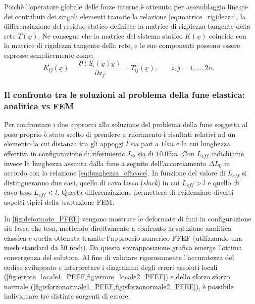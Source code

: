 Poichè l'operatore globale delle forze interne è ottenuto per assemblaggio lineare dei contributi dei singoli elementi tramite la relazione \eqref{eq:matrice_rigidezza}, la differenziazione del residuo statico definisce la matrice di rigidezza tangente della rete $T(\underline{x})$. Ne consegue che la matrice del sistema statico $K(\underline{x})$ coincide con la matrice di rigidezza tangente della rete, e le sue componenti possono essere espresse semplicemente come:
\begin{equation}
   K_{ij}(\underline{x}) = \frac{\partial (S_i(\underline{x})\underline{x})}{\partial x_j} = T_{ij}(\underline{x}),
   \qquad i,j = 1,\dots,2n.
   \label{eq:jacobiana_componenti2}
\end{equation}

\subsubsection{Il confronto tra le soluzioni al problema della fune elastica: analitica vs FEM }
Per confrontare i due approcci alla soluzione del problema della fune soggetta al peso proprio è stato scelto di prendere a riferimento i risultati relativi ad un elemento la cui distanza tra gli appoggi $l$ sia pari a $10m$ e la cui lunghezza effettiva in configurazione di riferimento $L_0$ sia di $10.05m$. Con $L_{eff}$ indichiamo invece la lunghezza assunta dalla fune a seguito dell'accorciamento $\Delta L_0$ in accordo con la relazione \eqref{eq:lunghezza_efficace}. In funzione del valore di $L_{eff}$ si distingueranno due casi, quello di cavo lasco (\textit{slack}) in cui $L_{eff}>l$ e quello di cavo teso $L_{eff}<l$. Questa differenziazione permetterà di evidenziare diversi aspetti tipici della trattazione FEM. 

In \cref{fig:deformate_PFEF} vengono mostrate le deformate di funi in configurazione sia lasca che tesa, mettendo direttamente a confronto la soluzione analitica classica e quella ottenuta tramite l'approccio numerico PFEF (utilizzando una mesh standard da 50 nodi). Da questa sovrapposizione grafica emerge l'ottima convergenza del solutore. Al fine di valutare rigorosamente l'accuratezza del codice sviluppato e interpretare i diagrammi degli errori assoluti locali (\cref{fig:errore_locale1_PFEF,fig:errore_locale2_PFEF}) e dello sforzo sforzo normale (\cref{fig:sforzonormale1_PFEF,fig:sforzonormale2_PFEF}), è possibile individuare tre distinte sorgenti di errore: 

